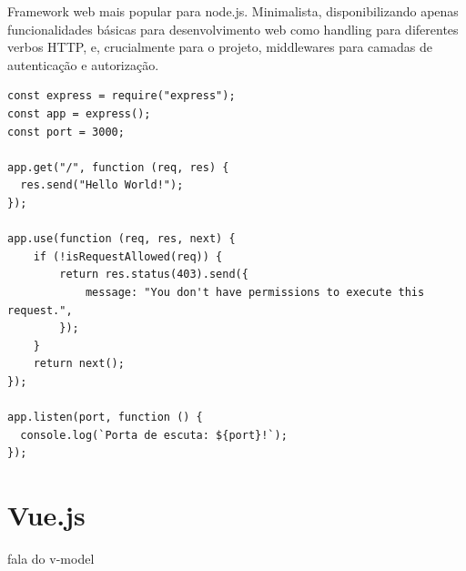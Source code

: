 Framework web mais popular para node.js. Minimalista,  disponibilizando apenas funcionalidades básicas para desenvolvimento web como handling para diferentes verbos HTTP, e, crucialmente para o projeto, middlewares para camadas de autenticação e autorização.


\begin{lstlisting}
const express = require("express");
const app = express();
const port = 3000;

app.get("/", function (req, res) {
  res.send("Hello World!");
});

app.use(function (req, res, next) {
    if (!isRequestAllowed(req)) {
        return res.status(403).send({
            message: "You don't have permissions to execute this request.",
        });
    }
    return next();
});

app.listen(port, function () {
  console.log(`Porta de escuta: ${port}!`);
});
\end{lstlisting}


\section{Vue.js}

fala do v-model